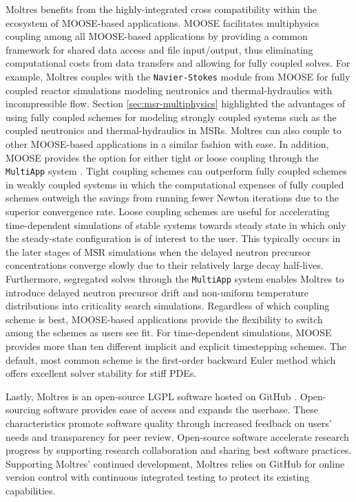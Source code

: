 Moltres benefits from the highly-integrated cross compatibility within the
ecosystem of MOOSE-based applications. MOOSE facilitates multiphysics coupling
among all MOOSE-based applications by providing a common framework for shared
data access and file input/output, thus eliminating computational costs from
data transfers and allowing for fully coupled solves. For example, Moltres
couples with the \texttt{Navier-Stokes} module \cite{peterson_overview_2018}
from MOOSE for fully coupled reactor simulations modeling neutronics and
thermal-hydraulics with incompressible flow. Section
\ref{sec:msr-multiphysics} highlighted the advantages of using fully coupled schemes
for modeling strongly coupled systems such as the coupled
neutronics and thermal-hydraulics in \glspl{MSR}. Moltres can also
couple to other MOOSE-based applications in a similar fashion with ease. In
addition, MOOSE
provides the option for either tight or loose coupling through the
\texttt{MultiApp} system \cite{gaston_physics-based_2015}. Tight coupling
schemes can outperform fully coupled schemes in weakly coupled systems in which
the computational expenses of fully coupled schemes outweigh the savings from
running fewer Newton iterations due to the superior convergence rate. Loose
coupling schemes are useful for accelerating time-dependent simulations of
stable systems towards steady state in which only the steady-state
configuration is of interest to the user. This typically occurs in the later
stages of \gls{MSR} simulations when the delayed neutron precursor
concentrations converge slowly due to their relatively large decay half-lives.
Furthermore, segregated solves through the \texttt{MultiApp} system enables
Moltres to introduce delayed neutron precursor drift and non-uniform
temperature distributions into criticality search simulations. Regardless of
which coupling scheme is best, MOOSE-based applications provide the flexibility
to switch among the schemes as users see fit. For time-dependent simulations,
MOOSE provides more than ten different implicit and explicit timestepping
schemes. The default, most common scheme is the first-order backward Euler
method which offers excellent solver stability for stiff \glspl{PDE}.

Lastly, Moltres is an open-source \gls{LGPL} software hosted on
GitHub \cite{github_build_2017}. Open-sourcing software provides ease of access
and expands the userbase. These characteristics promote software quality
through increased feedback on users' needs and transparency for peer review.
Open-source software accelerate research progress by supporting research
collaboration and sharing best software practices. Supporting Moltres'
continued development, Moltres relies on GitHub for online version control with
continuous integrated testing to protect its existing capabilities.

